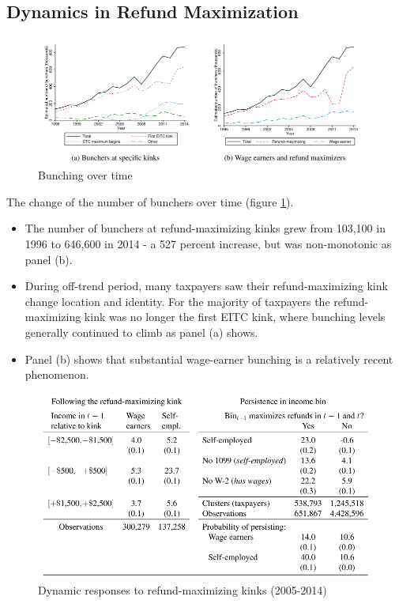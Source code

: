 \documentclass[../root]{subfiles}
\begin{document}
    \subsection{Dynamics in Refund Maximization}

    \begin{figure}[t]
        \centering
        \includegraphics[width = 0.8\linewidth]{0626kato/fig5.PNG}
        \caption{Bunching over time}
        \label{fig5}
    \end{figure}

    The change of the number of bunchers over time (figure \ref{fig5}).
    \begin{itemize}
        \item The number of bunchers at refund-maximizing kinks grew from 103,100 in 1996 to 646,600 in 2014 - a 527 percent increase, but was non-monotonic as panel (b).
        \item During off-trend period, many taxpayers saw their refund-maximizing kink change location and identity. For the majority of taxpayers the refund-maximizing kink was no longer the first EITC kink, where bunching levels generally continued to climb as panel (a) shows.
        \item Panel (b) shows that substantial wage-earner bunching is a relatively recent phenomenon.
    \end{itemize}

    \begin{figure}[t]
        \centering
        \includegraphics[width = 0.8\linewidth]{0626kato/tab3.PNG}
        \caption{Dynamic responses to refund-maximizing kinks (2005-2014)}
        \label{tab3}
    \end{figure}
\end{document}
